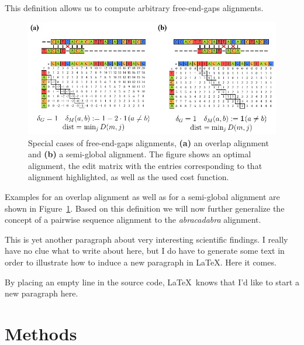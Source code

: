 \documentclass[american, a4paper, 12pt]{scrartcl}
\newcommand\randomtext[1]{\textcolor{gray!80}{\lipsum[#1]}}
\begin{document}
This definition allows us to compute arbitrary free-end-gaps alignments.
\begin{figure}[tp]
    \centering
    \includegraphics{gfx/figure_alignment_matrix.pdf}
    \caption{
        Special cases of free-end-gaps alignments, \textbf{(a)} an overlap alignment and
        \textbf{(b)} a semi-global alignment. The figure shows an optimal alignment, the edit matrix
        with the entries corresponding to that alignment highlighted, as well as the used cost
        function.
    }
    \label{fig:alignment_matrix}
\end{figure}
Examples for an overlap alignment as well as for a semi-global alignment are shown in
Figure~\ref{fig:alignment_matrix}. Based on this definition we will now further generalize the
concept of a pairwise sequence alignment to the \emph{abracadabra} alignment.

%

\randomtext{6-7}



This is yet another paragraph about very interesting scientific findings. I really have no clue what
to write about here, but I do have to generate some text in order to illustrate how to induce a new
paragraph in \LaTeX. Here it comes.

By placing an empty line in the source code, \LaTeX\ knows that I'd like to start a new paragraph
here. \randomtext{9}

\section{Methods}
\label{sec:methods}
\end{document}
